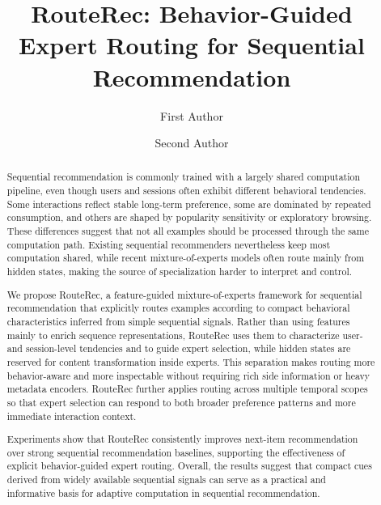\documentclass[sigconf,anonymous,review]{acmart}
\begin{document}
\title[RouteRec for Sequential Recommendation]{RouteRec: Behavior-Guided Expert Routing for Sequential Recommendation}

\author{First Author}

\author{Second Author}

\renewcommand{\shortauthors}{Author et al.}

\begin{abstract}
Sequential recommendation is commonly trained with a largely shared computation pipeline, even though users and sessions often exhibit different behavioral tendencies. Some interactions reflect stable long-term preference, some are dominated by repeated consumption, and others are shaped by popularity sensitivity or exploratory browsing. These differences suggest that not all examples should be processed through the same computation path. Existing sequential recommenders nevertheless keep most computation shared, while recent mixture-of-experts models often route mainly from hidden states, making the source of specialization harder to interpret and control.

We propose RouteRec, a feature-guided mixture-of-experts framework for sequential recommendation that explicitly routes examples according to compact behavioral characteristics inferred from simple sequential signals. Rather than using features mainly to enrich sequence representations, RouteRec uses them to characterize user- and session-level tendencies and to guide expert selection, while hidden states are reserved for content transformation inside experts. This separation makes routing more behavior-aware and more inspectable without requiring rich side information or heavy metadata encoders. RouteRec further applies routing across multiple temporal scopes so that expert selection can respond to both broader preference patterns and more immediate interaction context.

Experiments show that RouteRec consistently improves next-item recommendation over strong sequential recommendation baselines, supporting the effectiveness of explicit behavior-guided expert routing. Overall, the results suggest that compact cues derived from widely available sequential signals can serve as a practical and informative basis for adaptive computation in sequential recommendation.
\end{abstract}
\end{document}
